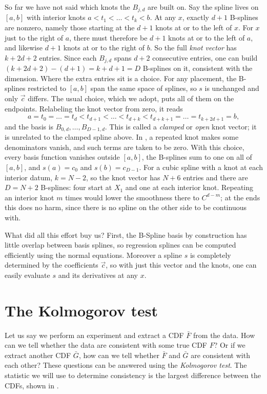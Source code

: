 So far we have not said which knots the $B_{j,d}$ are built on. Say the spline
lives on $[a,b]$ with interior knots $a<t_1<\dots<t_k<b$. At any $x$, exactly
$d+1$ B-splines are nonzero, namely those starting at the $d+1$ knots at or to
the left of $x$. For $x$ just to the right of $a$, there must therefore be
$d+1$ knots at or to the left of $a$, and likewise $d+1$ knots at or to the
right of $b$. So the full {\it knot vector} has $k+2d+2$
entries. Since each $B_{j,d}$ spans $d+2$ consecutive entries, one can build
$(k+2d+2)-(d+1)=k+d+1=D$ B-splines on it, consistent with the dimension.
Where the extra entries sit is a choice. For any placement, the B-splines
restricted to $[a,b]$ span the same space of splines, so $s$ is unchanged and
only $\vec{c}$ differs. The usual choice, which we adopt, puts all of them on
the endpoints. Relabeling the knot vector from zero, it reads
\begin{equation}
  a=t_0=\dots=t_d<t_{d+1}<\dots<t_{d+k}<t_{d+k+1}=\dots=t_{k+2d+1}=b ,
\end{equation}
and the basis is $B_{0,d},\dots,B_{D-1,d}$. This is called a {\it clamped}
 or {\it open} knot vector; it is unrelated to the
clamped spline above. In , a repeated knot makes some
denominators vanish, and such terms are taken to be zero. With this choice, every
basis function vanishes outside $[a,b]$, the B-splines sum to one on all of
$[a,b]$, and $s(a)=c_0$ and $s(b)=c_{D-1}$. For a cubic spline with a knot at
each interior datum, $k=N-2$, so the knot vector has $N+6$ entries and there are
$D=N+2$ B-splines: four start at $X_1$ and one at each interior knot.
Repeating an interior knot $m$ times would lower the smoothness there to
$C^{d-m}$; at the ends this does no harm, since there is no spline on the
other side to be continuous with.

What did all this effort buy us? First, the B-Spline basis by construction has
little overlap between basis splines, so regression splines can be computed
efficiently using the normal equations. Moreover a spline $s$ is completely
determined by the coefficients $\vec{c}$, so with just this vector and the
knots, one can easily evaluate $s$ and its derivatives at any $x$. 


\section{The Kolmogorov test}\label{sec:kolm}
Let us say we perform an experiment and extract a CDF $\bar{F}$ from 
the data. How can we tell whether the data are consistent with some
true CDF $F$? Or if we extract another CDF $\bar{G}$, how can
we tell whether $\bar{F}$ and $\bar{G}$ are consistent with each other?
These questions can be answered using the {\it Kolmogorov test}.
The statistic we will use to determine consistency is the
largest difference between the CDFs, shown in
.

